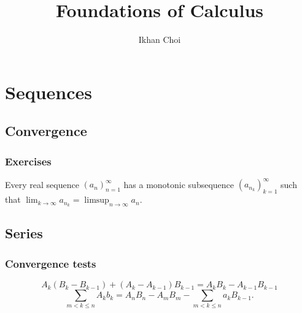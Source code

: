 \documentclass{../note}
\begin{document}
\title{Foundations of Calculus}
\author{Ikhan Choi}
\maketitle
\tableofcontents

\part{Sequences}
\chapter{Convergence}






\section*{Exercises}
\begin{prb}
Every real sequence $(a_n)_{n=1}^\infty$ has a monotonic subsequence $(a_{n_k})_{k=1}^\infty$ such that $\lim_{k\to\infty}a_{n_k}=\limsup_{n\to\infty}a_n$.
\end{prb}



\chapter{Series}

\section{Convergence tests}

\begin{prb}
\[A_k(B_k-B_{k-1})+(A_k-A_{k-1})B_{k-1}=A_kB_k-A_{k-1}B_{k-1}\]
\[\sum_{m<k\le n}A_kb_k=A_nB_n-A_mB_m-\sum_{m<k\le n}a_kB_{k-1}.\]
\end{prb}

\begin{prb}
\end{prb}
\end{document}
